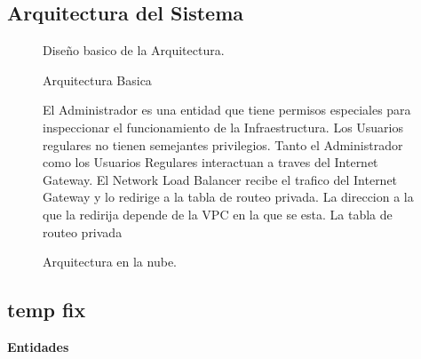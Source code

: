 \documentclass{article}
\begin{document}
  \subsection{Arquitectura del Sistema}
  \begin{figure}[!htb]
    \begin{center}
      
    \end{center}
    \caption{Arquitectura Basica}\label{fig: }
  Dise\~no basico de la Arquitectura.
  \end{figure}

  \begin{figure}[!htb]
    \begin{center}
       \end{center}
    \caption{Arquitectura en la nube.}\label{fig: Implementacion en la Nube}
    El Administrador es una entidad que tiene permisos especiales para inspeccionar el funcionamiento de la Infraestructura.
    Los Usuarios regulares no tienen semejantes privilegios.
    Tanto el Administrador como los Usuarios Regulares interactuan a traves del Internet Gateway.
    El Network Load Balancer recibe el trafico del Internet Gateway y lo redirige a la tabla de routeo privada. La direccion a la que la redirija depende de la VPC en la que se esta.
    La tabla de routeo privada 

  \end{figure}
  \subsection{temp fix}
  \textbf{ Entidades }
      \iffalse{
    NOTE 1—Design attributes can be thought of as questions about design elements. The answers to those questions are
    the values of the attributes. All the questions can be answered, but the content of the answer will depend upon the
    nature of the entity. The collection of answers provides a complete description of an entity. Attribute descriptions
    should include references and design considerations such as tradeoffs and assumptions when appropriate. In some
    cases, attribute descriptions may have the value none.
    NOTE 2—Design attributes have been generalized from the concept of design entity attribute (which appeared in
    IEEE Std 1016-1998 and applied only to design entities) to apply to design entities, design relationships, and design
    constraints.
    NOTE 3—Use of the design attributes in 4.6.2.1 through 4.6.2.3 ensures compatibility with IEEE Std 1016-1998. Other
    design attributes required as a part of specific design viewpoints are defined with those viewpoints in Clause 5. Some
    design attributes [such as subordinates (see 5.3.2.2)] can be more usefully represented as design relationships. This was
    endif
      } \fi 
\end{document}
